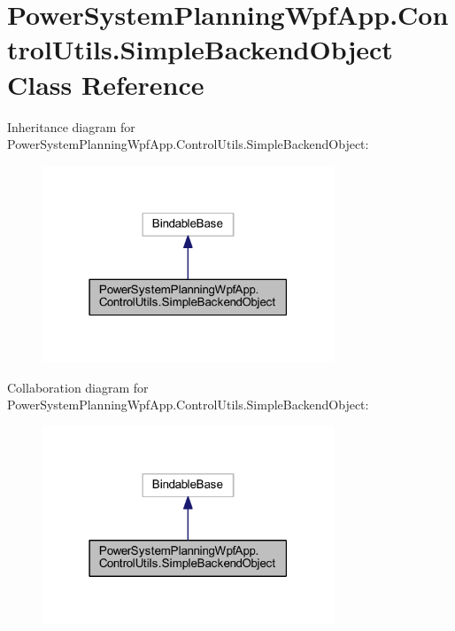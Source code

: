 \hypertarget{class_power_system_planning_wpf_app_1_1_control_utils_1_1_simple_backend_object}{}\section{Power\+System\+Planning\+Wpf\+App.\+Control\+Utils.\+Simple\+Backend\+Object Class Reference}
\label{class_power_system_planning_wpf_app_1_1_control_utils_1_1_simple_backend_object}


Inheritance diagram for Power\+System\+Planning\+Wpf\+App.\+Control\+Utils.\+Simple\+Backend\+Object\+:\nopagebreak
\begin{figure}[H]
\begin{center}
\leavevmode
\includegraphics[width=247pt]{class_power_system_planning_wpf_app_1_1_control_utils_1_1_simple_backend_object__inherit__graph}
\end{center}
\end{figure}


Collaboration diagram for Power\+System\+Planning\+Wpf\+App.\+Control\+Utils.\+Simple\+Backend\+Object\+:\nopagebreak
\begin{figure}[H]
\begin{center}
\leavevmode
\includegraphics[width=247pt]{class_power_system_planning_wpf_app_1_1_control_utils_1_1_simple_backend_object__coll__graph}
\end{center}
\end{figure}

